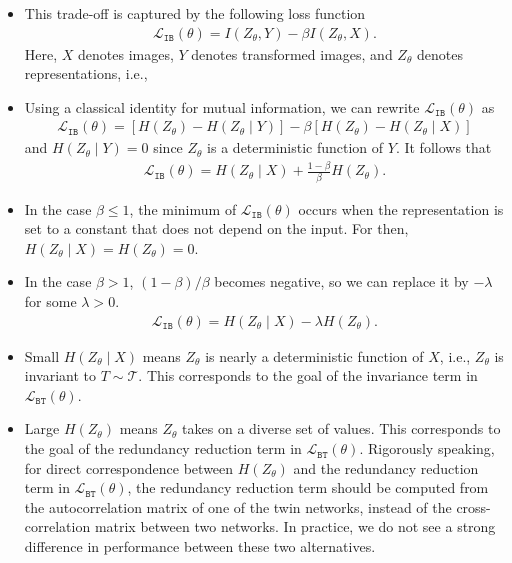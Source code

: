 \documentclass[10pt]{article}
\newcommand{\LL}{\mathcal{L}}
\newcommand{\TT}{\mathcal{T}}
\newcommand{\bt}{{\texttt{BT}}}
\newcommand{\ib}{{\texttt{IB}}}
\begin{document}
\begin{itemize}
\item This trade-off is captured by the following loss function
\begin{align*}
\LL_\ib(\theta) = I(Z_\theta,Y) - \beta I(Z_\theta,X).
\end{align*}
Here, $X$ denotes images, $Y$ denotes transformed images, and $Z_\theta$ denotes representations, i.e.,
\begin{center}
\end{center}
\item Using a classical identity for mutual information, we can rewrite $\LL_\ib(\theta)$ as
\begin{align*}
\LL_\ib(\theta) = [H(Z_\theta) - H(Z_\theta \mid Y)] - \beta[ H(Z_\theta) - H(Z_\theta \mid X)]
\end{align*}
and $H(Z_\theta \mid Y) = 0$ since $Z_\theta$ is a deterministic function of $Y$. It follows that
\begin{align*}
\LL_\ib(\theta) = H(Z_\theta \mid X) + \frac{1 - \beta}{\beta} H(Z_\theta).
\end{align*}
\item In the case $\beta \leq 1$, the minimum of $\LL_\ib(\theta)$ occurs when the representation is set to a constant that does not depend on the input. For then, $H(Z_\theta \mid X) = H(Z_\theta) = 0$.
\item In the case $\beta > 1$, $(1 - \beta) / \beta$ becomes negative, so we can replace it by $-\lambda$ for some $\lambda > 0$.
\begin{align*}
\LL_\ib(\theta) = H(Z_\theta \mid X) - \lambda H(Z_\theta).
\end{align*}
\item Small $H(Z_\theta \mid X)$ means $Z_\theta$ is nearly a deterministic function of $X$, i.e., $Z_\theta$ is invariant to $T \sim \TT$. This corresponds to the goal of the invariance term in $\LL_\bt(\theta)$.
\item Large $H(Z_\theta)$ means $Z_\theta$ takes on a diverse set of values. This corresponds to the goal of the redundancy reduction term in $\LL_\bt(\theta)$. Rigorously speaking, for direct correspondence between $H(Z_\theta)$ and the redundancy reduction term in $\LL_\bt(\theta)$, the redundancy reduction term should be computed from the autocorrelation matrix of one of the twin networks, instead of the cross-correlation matrix between two networks. In practice, we do not see a strong difference in performance between these two alternatives.
\end{itemize}
\end{document}
